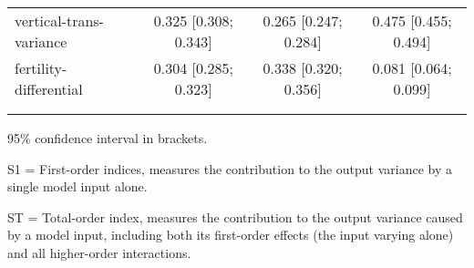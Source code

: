 \begin{table}[htp]
\begin{threeparttable}
\begin{tabular}{lccc}
	  \hspace{1.5em} vertical-trans-variance & 0.325 [0.308; 0.343]   & 0.265 [0.247; 0.284]   & 0.475 [0.455; 0.494] \\
	  \hspace{1.5em} fertility-differential & 0.304 [0.285; 0.323]   & 0.338 [0.320; 0.356]   & 0.081 [0.064; 0.099] \\
	 \\
\addlinespace
\hline
\end{tabular}
\begin{tablenotes}
\scriptsize
\item 95\% confidence interval in brackets.
\item S1 = First-order indices,  measures the contribution to the output variance by a single model input alone.
\item ST = Total-order index, measures the contribution to the output variance caused by a model input, including both its first-order effects (the input varying alone) and all higher-order interactions.
\end{tablenotes}
\end{threeparttable}
\end{table}